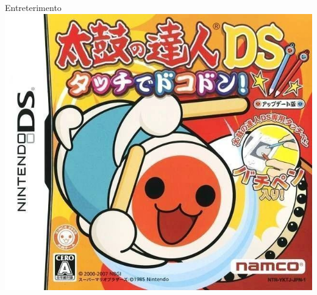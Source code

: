 \documentclass{beamer}
\begin{document}
\begin{frame}{Entreterimento}
    \includegraphics[height=0.4\textheight]{ds}
\end{frame}
\end{document}
